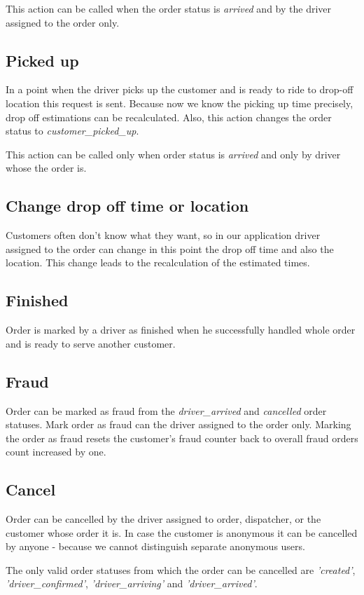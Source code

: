 			This action can be called when the order status is \textit{arrived} and by the driver assigned to the order only.
		\subsection{Picked up}
            In a point when the driver picks up the customer and is ready to ride to drop-off location this request is sent. Because now we know the picking up time precisely, drop off estimations can be recalculated. Also, this action changes the order status to \textit{customer\_picked\_up}.

			This action can be called only when order status is \textit{arrived} and only by driver whose the order is.
		\subsection{Change drop off time or location}
			Customers often don't know what they want, so in our application driver assigned to the order can change in this point the drop off time and also the location. This change leads to the recalculation of the estimated times. 
		\subsection{Finished}
		Order is marked by a driver as finished when he successfully handled whole order and is ready to serve another customer.
		\subsection{Fraud}
			Order can be marked as fraud from the \textit{driver\_arrived} and \textit{cancelled} order statuses. Mark order as fraud can the driver assigned to the order only. Marking the order as fraud resets the customer's fraud counter back to overall fraud orders count increased by one.
		\subsection{Cancel}
			Order can be cancelled by the driver assigned to order, dispatcher, or the customer whose order it is. In case the customer is anonymous it can be cancelled by anyone - because we cannot distinguish separate anonymous users.
			
			The only valid order statuses from which the order can be cancelled are \textit{'created'}, \textit{'driver\_confirmed'}, \textit{'driver\_arriving'} and \textit{'driver\_arrived'}.
			
